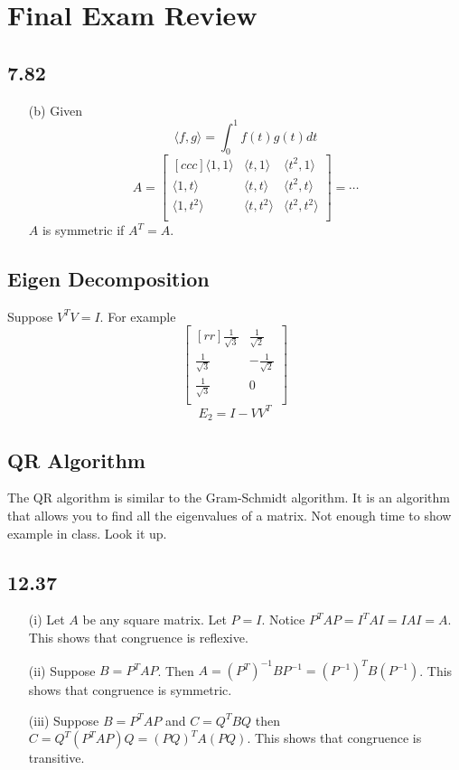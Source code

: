 \documentclass{report}
\theoremstyle{plain}
\theoremstyle{definition}
\theoremstyle{plain}
\begin{document}
\section{Final Exam Review}
\subsection{7.82}
\begin{enumerate}
\item[(b)]Given
\[ \langle f,g \rangle = \int_{0}^1 f(t)g(t)dt \]
\[ A=\begin{bmatrix}[ccc]\langle 1,1 \rangle & \langle t,1 \rangle & \langle t^2,1 \rangle\\\langle 1,t \rangle & \langle t,t \rangle & \langle t^2,t \rangle\\\langle 1,t^2 \rangle & \langle t,t^2 \rangle & \langle t^2,t^2\rangle\\\end{bmatrix} = \cdots \]
$A$ is symmetric if $A^T=A$.
\end{enumerate}

\subsection{Eigen Decomposition}
Suppose $V^TV = I$. For example
\[ \begin{bmatrix}[rr]\frac{1}{\sqrt{3}} & \frac{1}{\sqrt{2}}\\\frac{1}{\sqrt{3}}&-\frac{1}{\sqrt{2}}\\\frac{1}{\sqrt{3}}&0\\\end{bmatrix} \]
\[ E_2 = I- VV^T \]

\subsection{QR Algorithm}
The QR algorithm is similar to the Gram-Schmidt algorithm. It is an algorithm that allows you to find all the eigenvalues of a matrix. Not enough time to show example in class. Look it up.

\subsection{12.37}
\begin{enumerate}
\item[(i)]Let $A$ be any square matrix. Let $P=I$. Notice $P^TAP=I^TAI=IAI=A$. This shows that congruence is reflexive.
\item[(ii)]Suppose $B=P^TAP$. Then $A=(P^T)^{-1}BP^{-1} = (P^{-1})^TB(P^{-1})$. This shows that congruence is symmetric.
\item[(iii)]Suppose $B=P^TAP$ and $C=Q^TBQ$ then $C=Q^T(P^TAP)Q=(PQ)^TA(PQ)$. This shows that congruence is transitive.
\end{enumerate}
\end{document}
